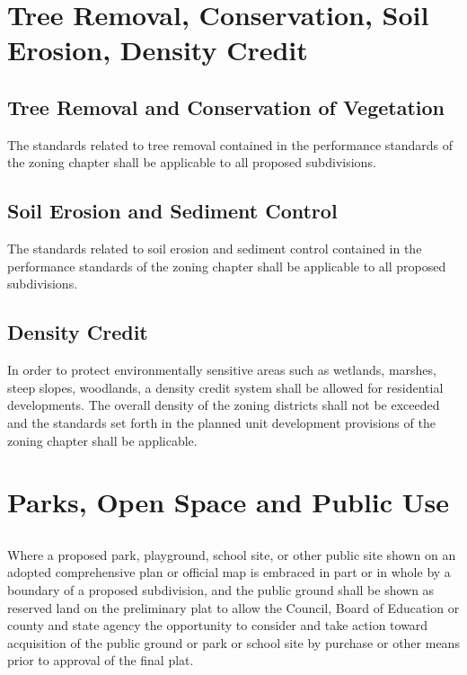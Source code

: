 \section{Tree Removal, Conservation, Soil Erosion, Density Credit}
\subsection{Tree Removal and Conservation of Vegetation}
The standards related to tree removal contained in the performance standards of the zoning chapter shall be applicable to all proposed subdivisions.
\subsection{Soil Erosion and Sediment Control}
The standards related to soil erosion and sediment control contained in the performance standards of the zoning chapter shall be applicable to all proposed subdivisions.
\subsection{Density Credit}
In order to protect environmentally sensitive areas such as wetlands, marshes, steep slopes, woodlands, a density credit system shall be allowed for residential developments.  The overall density of the zoning districts shall not be exceeded and the standards set forth in the planned unit development provisions of the zoning chapter shall be applicable.

\section{Parks, Open Space and Public Use}
\subsection{}
Where a proposed park, playground, school site, or other public site shown on an adopted comprehensive plan or official map is embraced in part or in whole by a boundary of a proposed subdivision, and the public ground shall be shown as reserved land on the preliminary plat to allow the Council, Board of Education or county and state agency the opportunity to consider and take action toward acquisition of the public ground or park or school site by purchase or other means prior to approval of the final plat.
